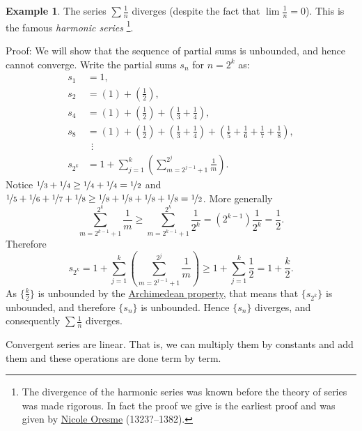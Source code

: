 \documentclass[12pt]{book}
\newcommand{\myindex}[1]{#1\index{#1}}
\theoremstyle{plain}
\theoremstyle{remark}
\theoremstyle{definition}
\theoremstyle{exercise}
\theoremstyle{example}
\newtheorem{example}[thm]{Example}
\begin{document}
\begin{example} \label{example:harmonicseries}
The series $\sum \frac{1}{n}$ diverges (despite the fact that $\lim
\frac{1}{n} = 0$).  This is the famous \emph{\myindex{harmonic series}}%
\footnote{The divergence of the harmonic series was known 
before the theory of series was made rigorous.  In fact the proof we
give is the earliest proof and was given by
\href{http://en.wikipedia.org/wiki/Oresme}{Nicole Oresme}
(1323?--1382).}.

Proof: We will show that the sequence of partial sums is unbounded, and hence
cannot converge.
Write the partial sums $s_n$ for $n = 2^k$ as:
\begin{align*}
 s_1 & = 1 , \\
 s_2 & = \left( 1 \right) + \left( \frac{1}{2} \right) , \\
 s_4 & = \left( 1 \right) + \left( \frac{1}{2} \right) +
        \left( \frac{1}{3} + \frac{1}{4} \right) , \\
 s_8 & = \left( 1 \right) + \left( \frac{1}{2} \right) +
        \left( \frac{1}{3} + \frac{1}{4} \right) +
        \left( \frac{1}{5} + \frac{1}{6} + \frac{1}{7} + \frac{1}{8} \right) , \\
& ~~ \vdots \\
 s_{2^k} & = 
1 + 
\sum_{j=1}^k
\left(
\sum_{m=2^{j-1}+1}^{2^j} \frac{1}{m}
\right) .
\end{align*}
Notice $\nicefrac{1}{3} + \nicefrac{1}{4} \geq \nicefrac{1}{4} + \nicefrac{1}{4} =
\nicefrac{1}{2}$ and
$\nicefrac{1}{5} + \nicefrac{1}{6} + \nicefrac{1}{7} + \nicefrac{1}{8}
\geq \nicefrac{1}{8} + \nicefrac{1}{8} + \nicefrac{1}{8} + \nicefrac{1}{8} =
\nicefrac{1}{2}$.  More generally
\begin{equation*}
\sum_{m=2^{k-1}+1}^{2^k} \frac{1}{m}
\geq
\sum_{m=2^{k-1}+1}^{2^k} \frac{1}{2^k}
=
(2^{k-1}) \frac{1}{2^k} = \frac{1}{2} .
\end{equation*}
Therefore
\begin{equation*}
s_{2^k} = 
1 + 
\sum_{j=1}^k
\left(
\sum_{m=2^{j-1}+1}^{2^j} \frac{1}{m}
\right) 
\geq
1 + \sum_{j=1}^k \frac{1}{2} = 1 + \frac{k}{2} .
\end{equation*}
As $\{ \frac{k}{2} \}$ is unbounded by the
\hyperref[thm:arch:i]{Archimedean property}, that means that
$\{ s_{2^k} \}$ is unbounded, and therefore $\{ s_n \}$ is unbounded.
Hence $\{ s_n \}$ diverges, and consequently $\sum \frac{1}{n}$ diverges.
\end{example}

Convergent series are linear.  That is, we can multiply them by constants
and add them and these operations are done term by term.
\end{document}
